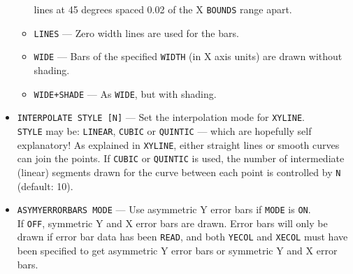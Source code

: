 \documentclass[a4paper,twoside,11pt]{article}
\newcommand{\textttc}[1]{\texttt{\textcolor{OurRed}{#1}}}
\begin{document}
\begin{itemize}
\begin{itemize}
   lines at 45 degrees spaced 0.02 of the X \texttt{BOUNDS} range
   apart.
   \item \textttc{LINES} --- Zero width lines are used for the bars.
   \item \textttc{WIDE} --- Bars of the specified \texttt{WIDTH} (in X axis units) are drawn without shading.
   \item \textttc{WIDE+SHADE} --- As \texttt{WIDE}, but with shading.
   \end{itemize}
\item \textttc{INTERPOLATE STYLE [N]} --- Set the interpolation mode for \texttt{XYLINE}.\\
   \texttt{STYLE} may be: \texttt{LINEAR}, \texttt{CUBIC} or \texttt{QUINTIC} --- which are hopefully self explanatory!
   As explained in \texttt{XYLINE}, either straight lines or smooth curves can join the points. 
   If \texttt{CUBIC} or \texttt{QUINTIC} is used, the
   number of intermediate (linear) segments drawn for the curve between each point is controlled by \texttt{N} (default: 10).
\item \textttc{ASYMYERRORBARS MODE} --- Use asymmetric Y error bars if \texttt{MODE} is \texttt{ON}.\\
   If \texttt{OFF}, symmetric Y and X error bars are drawn. Error bars will only be drawn if error bar
   data has been \texttt{READ}, and both \texttt{YECOL} and \texttt{XECOL} must have been 
   specified to get asymmetric Y error bars or
   symmetric Y and X error bars.
\end{itemize}
\end{document}

